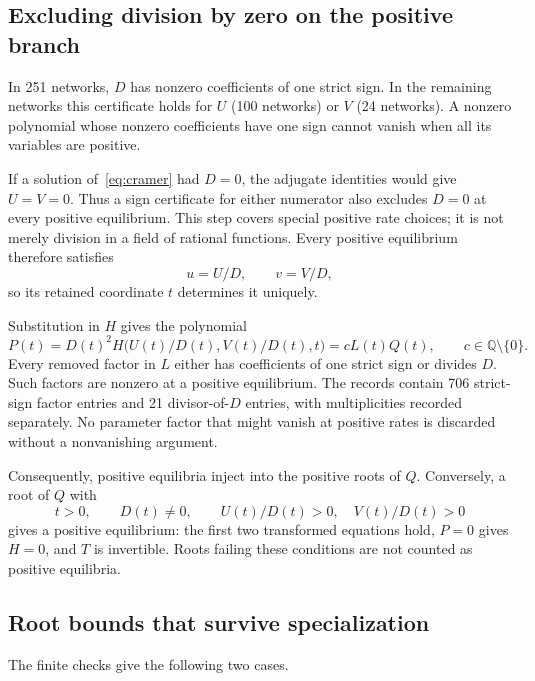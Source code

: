 \documentclass[11pt,a4paper]{article}
\begin{document}
\subsection{Excluding division by zero on the positive branch}
In 251 networks, $D$ has nonzero coefficients of one strict sign.
In the remaining networks this certificate holds for $U$ (100
networks) or $V$ (24 networks). A nonzero polynomial whose nonzero
coefficients have one sign cannot vanish when all its variables
are positive.

If a solution of~\eqref{eq:cramer} had $D=0$, the adjugate
identities would give $U=V=0$. Thus a sign certificate for either
numerator also excludes $D=0$ at every positive equilibrium.
This step covers special positive rate choices; it is not merely
division in a field of rational functions. Every positive equilibrium
therefore satisfies
\[
 u=U/D,\qquad v=V/D,
\]
so its retained coordinate $t$ determines it uniquely.

Substitution in $H$ gives the polynomial
\begin{equation}\label{eq:residual}
 P(t)=D(t)^2 H\bigl(U(t)/D(t),V(t)/D(t),t\bigr)
      =c L(t)Q(t),\qquad c\in\mathbb Q\setminus\{0\}.
\end{equation}
Every removed factor in $L$ either has coefficients of one strict
sign or divides $D$. Such factors are nonzero at a positive
equilibrium. The records contain 706 strict-sign factor entries
and 21 divisor-of-$D$ entries, with multiplicities recorded separately.
No parameter factor that might vanish at positive rates is discarded
without a nonvanishing argument.

Consequently, positive equilibria inject into the positive roots of
$Q$. Conversely, a root of $Q$ with
\begin{equation}\label{eq:admissible}
 t>0,\qquad D(t)\ne0,\qquad U(t)/D(t)>0,\quad V(t)/D(t)>0
\end{equation}
gives a positive equilibrium: the first two transformed equations
hold, $P=0$ gives $H=0$, and $T$ is invertible. Roots failing these
conditions are not counted as positive equilibria.

\subsection{Root bounds that survive specialization}
The finite checks give the following two cases.
\end{document}

